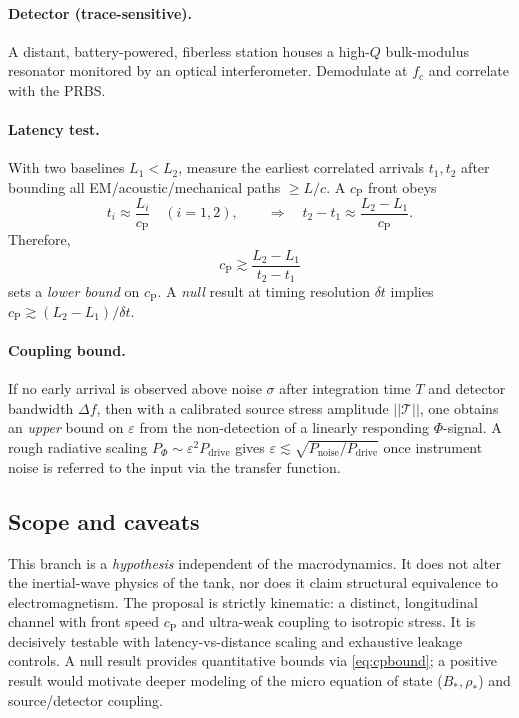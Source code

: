 \documentclass[12pt]{article}
\begin{document}
\paragraph{Detector (trace-sensitive).} A distant, battery-powered, fiberless station houses a high-$Q$ bulk-modulus resonator monitored by an optical interferometer. Demodulate at $f_c$ and correlate with the PRBS.

\paragraph{Latency test.} With two baselines $L_1<L_2$, measure the earliest correlated arrivals $t_1,t_2$ after bounding all EM/acoustic/mechanical paths $\ge L/c$. A $c_{\mathrm{P}}$ front obeys
\begin{equation}
t_i \approx \frac{L_i}{c_{\mathrm{P}}}\quad (i=1,2),\qquad
\Rightarrow\quad
t_2-t_1 \approx \frac{L_2-L_1}{c_{\mathrm{P}}}.
\end{equation}
Therefore,
\begin{equation}
\boxed{~c_{\mathrm{P}} \gtrsim \frac{L_2-L_1}{\,t_2-t_1\,}~}
\label{eq:cpbound}
\end{equation}
sets a \emph{lower bound} on $c_{\mathrm{P}}$. A \emph{null} result at timing resolution $\delta t$ implies $c_{\mathrm{P}} \gtrsim (L_2-L_1)/\delta t$.

\paragraph{Coupling bound.} If no early arrival is observed above noise $\sigma$ after integration time $T$ and detector bandwidth $\Delta f$, then with a calibrated source stress amplitude $||\mathcal{T}||$, one obtains an \emph{upper} bound on $\varepsilon$ from the non-detection of a linearly responding $\Phi$-signal. A rough radiative scaling $P_\Phi \sim \varepsilon^2 P_{\mathrm{drive}}$ gives $\varepsilon \lesssim \sqrt{P_{\mathrm{noise}}/P_{\mathrm{drive}}}$ once instrument noise is referred to the input via the transfer function.

\subsection{Scope and caveats}
This branch is a \emph{hypothesis} independent of the macrodynamics. It does not alter the inertial-wave physics of the tank, nor does it claim structural equivalence to electromagnetism. The proposal is strictly kinematic: a distinct, longitudinal channel with front speed $c_{\mathrm{P}}$ and ultra-weak coupling to isotropic stress. It is decisively testable with latency-vs-distance scaling and exhaustive leakage controls. A null result provides quantitative bounds via \eqref{eq:cpbound}; a positive result would motivate deeper modeling of the micro equation of state ($B_*,\rho_*$) and source/detector coupling.
\end{document}
